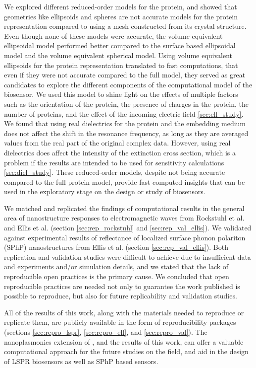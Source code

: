 We explored different reduced-order models for the protein, and showed that geometries like ellipsoids and spheres
are not accurate models for the protein representation compared to using a mesh constructed from its crystal structure. Even though
none of these models were accurate, the volume equivalent ellipsoidal model performed better compared to the surface based ellipsoidal 
model and the volume equivalent spherical model. Using volume equivalent ellipsoids for the protein representation 
translated to fast computations, that even if they were not accurate compared to the full model, they served as great candidates to
explore the different components of the computational model of the biosensor. We used this model to shine light on the effects of multiple factors such as 
the orientation of the protein, the presence of charges in the protein, the number of proteins, and the effect of the incoming electric field \ref{sec:ell_study}.
We found that using real dielectrics for the protein and the embedding medium does not affect the shift in the resonance frequency, 
as long as they are averaged values from the real part of the original complex data. However, using real dielectrics does affect the 
intensity of the extinction cross section, which is a problem if the results are intended to be used for sensitivity calculations \ref{sec:diel_study}. 
These reduced-order models, despite not being accurate compared to the full protein model, provide fast computed insights that can be used 
in the exploratory stage on the design or study of biosensors.

We matched and replicated the findings of computational results in the general area of nanostructure responses to electromagnetic waves 
from Rockstuhl et al. \cite{rockstuhl2005} and Ellis et al.\cite{ellis2016} (section \ref{sec:rep_rockstuhl} and \ref{sec:rep_val_ellis}). We validated
\pygbe against experimental results of reflectance of localized surface phonon polariton (SPhP) nanostructures from Ellis et 
al. (section \ref{sec:rep_val_ellis}). Both replication and validation studies were difficult to achieve due to insufficient data and experiments 
and/or simulation details, and we stated that the lack of reproducible open practices is the primary cause. We concluded that open reproducible 
practices are needed not only to guarantee the work published is possible to reproduce, but also for future replicability and validation studies. 

All of the results of this work, along with the materials needed to reproduce or replicate them, are publicly available in the form of 
reproducibility packages (sections \ref{sec:repro_lspr}, \ref{sec:repro_ell}, and \ref{sec:repro_val}). The nanoplasmonics extension of \pygbe, and 
the results of this work, can offer a valuable computational approach for the future studies on the field, and aid in the design of LSPR biosensors 
as well as SPhP based sensors. 


